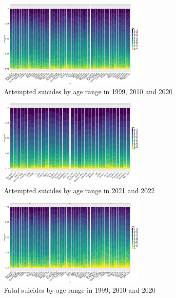 \documentclass{article}
\begin{document}
%
%
%
\begin{figure}[H]
    \centering
    \includegraphics[width=0.65\textwidth]{imgs/age_city_att_op-991020.pdf}
    \caption{Attempted suicides by age range in 1999, 2010 and 2020}
    \label{fig:age_city_att_op-991020}
\end{figure}

\begin{figure}[H]
    \centering
    \includegraphics[width=0.65\textwidth]{imgs/age_city_op-2122.pdf}
    \caption{Attempted suicides by age range in 2021 and 2022}
    \label{fig:age_city_att_op-2122}
\end{figure}

\begin{figure}[H]
    \centering
    \includegraphics[width=0.65\textwidth]{imgs/age_city_fat_op-991020.pdf}
    \caption{Fatal suicides by age range in 1999, 2010 and 2020}
    \label{fig:age_city_fat_op-991020}
\end{figure}
\end{document}
